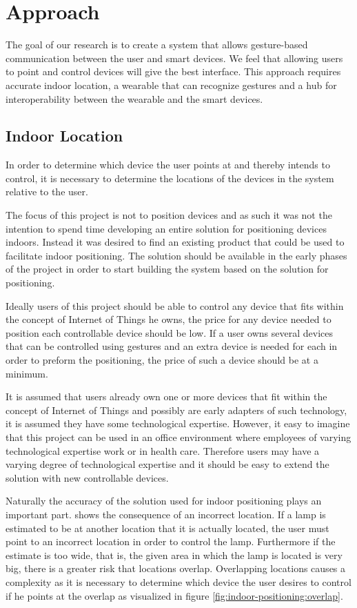 \section{Approach}\label{sec:approach}
The goal of our research is to create a system that allows gesture-based communication between the user and smart devices.
We feel that allowing users to point and control devices will give the best interface. 
This approach requires accurate indoor location, a wearable that can recognize gestures and a hub for interoperability between the wearable and the smart devices. 

\subsection{Indoor Location}
In order to determine which device the user points at and thereby intends to control, 
it is necessary to determine the locations of the devices in the system relative to the user.

The focus of this project is not to position devices and as such it was not the intention to spend time developing an entire solution for positioning devices indoors. 
Instead it was desired to find an existing product that could be used to facilitate indoor positioning.
The solution should be available in the early phases of the project in order to start building the system based on the solution for positioning.

Ideally users of this project should be able to control any device that fits within the concept of Internet of Things he owns, 
the price for any device needed to position each controllable device should be low. 
If a user owns several devices that can be controlled using gestures and an extra device is needed for each in order to preform the positioning, 
the price of such a device should be at a minimum.

It is assumed that users already own one or more devices that fit within the concept of Internet of Things and possibly are early adapters of such technology, 
it is assumed they have some technological expertise. 
However, it easy to imagine that this project can be used in an office environment where employees of varying technological expertise work or in health care. 
Therefore users may have a varying degree of technological expertise and it should be easy to extend the solution with new controllable devices.

Naturally the accuracy of the solution used for indoor positioning plays an important part. 
 shows the consequence of an incorrect location. 
If a lamp is estimated to be at another location that it is actually located, 
the user must point to an incorrect location in order to control the lamp.
Furthermore if the estimate is too wide, that is, the given area in which the lamp is located is very big, 
there is a greater risk that locations overlap. 
Overlapping locations causes a complexity as it is necessary to determine which device the user desires to control if he points at the overlap as visualized in figure \ref{fig:indoor-positioning:overlap}.

